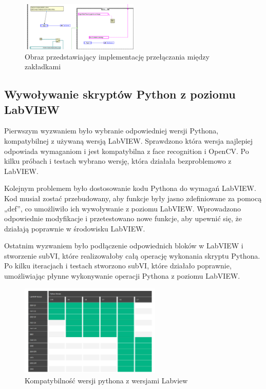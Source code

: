 \documentclass{report}
\begin{document}
\begin{figure}[H]
    \centering
    \includegraphics[width=0.5\textwidth]{src/tab-control-page.png}
    \caption{Obraz przedstawiający implementację przełączania między zakładkami}
    \label{fig:tab-control-page}
\end{figure}



\subsection{\Large Wywoływanie skryptów Python z poziomu LabVIEW}

%
%
Pierwszym wyzwaniem było wybranie odpowiedniej wersji Pythona, kompatybilnej z używaną wersją LabVIEW. Sprawdzono która wersja najlepiej odpowiada wymaganiom i jest kompatybilna z face recognition i OpenCV. Po kilku próbach i testach wybrano wersję, która działała bezproblemowo z LabVIEW.

Kolejnym problemem było dostosowanie kodu Pythona do wymagań LabVIEW. Kod musiał zostać przebudowany, aby funkcje były jasno zdefiniowane za pomocą „def”, co umożliwiło ich wywoływanie z poziomu LabVIEW. Wprowadzono odpowiednie modyfikacje i przetestowano nowe funkcje, aby upewnić się, że działają poprawnie w środowisku LabVIEW.

Ostatnim wyzwaniem było podłączenie odpowiednich bloków w LabVIEW i stworzenie subVI, które realizowałoby całą operację wykonania skryptu Pythona.  Po kilku iteracjach i testach stworzono subVI, które działało poprawnie, umożliwiając płynne wykonywanie operacji Pythona z poziomu LabVIEW.
\begin{figure}[H]
    \centering
    \includegraphics[width=0.6\textwidth]{src/python-v.png}
    \caption{Kompatybilność wersji pythona z wersjami Labview}
    \label{fig:python-version}
\end{figure}
\end{document}
